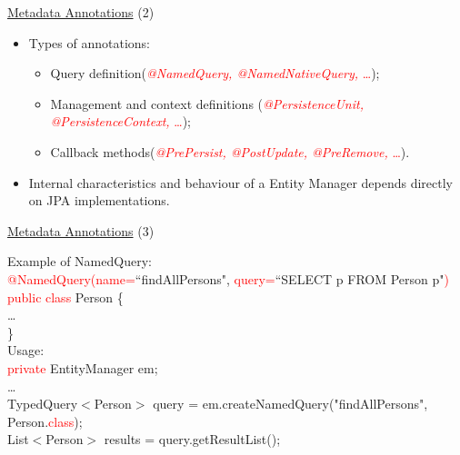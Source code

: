 \documentclass[xcolor=x11names,compress]{beamer}
\renewcommand{\(}{\begin{columns}}
\renewcommand{\)}{\end{columns}}
\newcommand{\<}[1]{\begin{column}{#1}}
\renewcommand{\>}{\end{column}}
\begin{document}
\begin{frame}{\underline{Metadata Annotations} (2)}

\begin{itemize}
\itemsep 12pt
\justifying

\item Types of annotations:
\begin{itemize}
\itemsep 12pt
\justifying

\item Query definition(\textcolor{red}{\textit{@NamedQuery, @NamedNativeQuery,} \ldots});

\item Management and context definitions (\textcolor{red}{\textit{@PersistenceUnit, @PersistenceContext,} \ldots});

\item Callback methods(\textcolor{red}{\textit{@PrePersist, @PostUpdate, @PreRemove,} \ldots}).

\end{itemize}

\item Internal characteristics and behaviour of a Entity Manager depends directly on JPA implementations.

\end{itemize}

\end{frame}

\begin{frame}{\underline{Metadata Annotations} (3)}

Example of NamedQuery: \\[2mm]
{\footnotesize
\textcolor{red}{@NamedQuery(name=}``findAllPersons", \textcolor{red}{query=}``SELECT p FROM Person p"\textcolor{red}{)} \\
\textcolor{red}{public class} Person \{ \\[3mm]
\ldots \\
\} \\[3mm]
}
Usage: \\[2mm]
{\footnotesize
\textcolor{red}{private} EntityManager em; \\[2mm]
\ldots \\[2mm]
 TypedQuery$<$Person$>$ query = em.createNamedQuery("findAllPersons", Person.\textcolor{red}{class}); \\[2mm]
  List$<$Person$>$ results = query.getResultList(); 
}
\end{frame}
\end{document}
